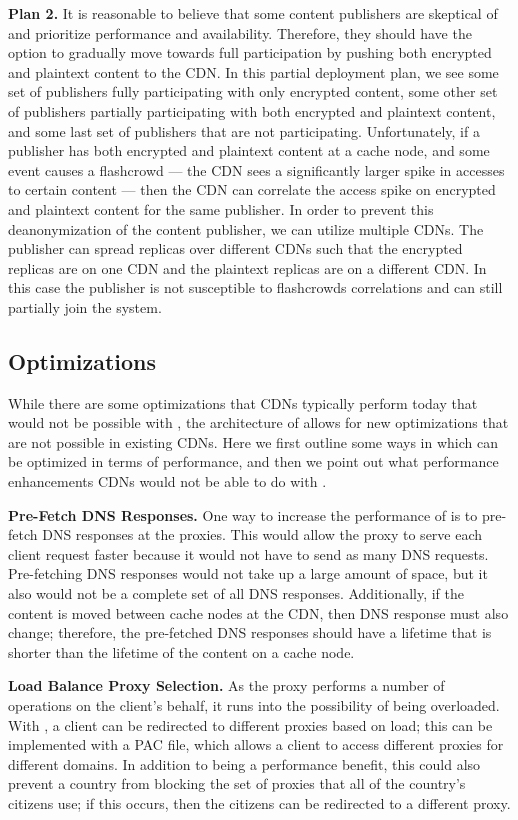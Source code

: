 {\bf Plan 2.} 
It is reasonable to believe that some content publishers are skeptical of \system{} and prioritize performance 
and availability.  Therefore, they should have the option to gradually move towards full participation by pushing 
both encrypted and plaintext content to the CDN.  In this partial deployment plan, we see some set of publishers 
fully participating with only encrypted content, some other set of publishers partially participating with both 
encrypted and plaintext content, and some last set of publishers that are not participating.  Unfortunately, if 
a publisher has both encrypted and plaintext content at a cache node, and some event causes a flashcrowd --- 
the CDN sees a significantly larger spike in accesses to certain content --- then the CDN can correlate the access 
spike on encrypted and plaintext content for the same publisher.  In order to prevent this deanonymization of the 
content publisher, we can utilize multiple CDNs.  The publisher can spread replicas over different CDNs such that 
the encrypted replicas are on one CDN and the plaintext replicas are on a different CDN.  In this case the publisher 
is not susceptible to flashcrowds correlations and can still partially join the system.

\subsection{Optimizations}
While there are some optimizations that CDNs typically perform today that would not be possible with \system{}, the architecture 
of \system{} allows for new optimizations that are not possible in existing CDNs.  Here we first outline some ways in which \system{} 
can be optimized in terms of performance, and then we point out what performance enhancements CDNs would not be able to do with 
\system{}.

{\bf Pre-Fetch DNS Responses.} One way to increase the performance of \system{} is to pre-fetch DNS responses at 
the proxies.  This would allow the proxy to serve each client request faster because it would not have to send 
as many DNS requests.  Pre-fetching DNS responses would not take up a large amount of space, but it also 
would not be a complete set of all DNS responses.  Additionally, if the content is moved between cache nodes 
at the CDN, then DNS response must also change; therefore, the pre-fetched DNS responses should have a 
lifetime that is shorter than the lifetime of the content on a cache node.

{\bf Load Balance Proxy Selection.} As the proxy performs a number of operations on the client's behalf, it 
runs into the possibility of being overloaded.  With \system{}, a client can be redirected to different 
proxies based on load; this can be implemented with a PAC file, which allows 
a client to access different proxies for different domains.  In addition to being a performance benefit, 
this could also prevent a country from blocking the set of proxies that all of the country's citizens use; if 
this occurs, then the citizens can be redirected to a different proxy.   

